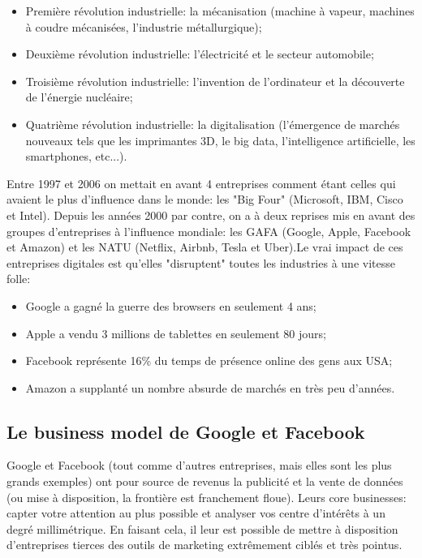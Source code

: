 \begin{itemize}
    \item Première révolution industrielle: la mécanisation (machine à vapeur, machines à coudre mécanisées, l'industrie métallurgique);
    \item Deuxième révolution industrielle: l'électricité et le secteur automobile;
    \item Troisième révolution industrielle: l'invention de l'ordinateur et la découverte de l'énergie nucléaire;
    \item Quatrième révolution industrielle: la digitalisation (l'émergence de marchés nouveaux tels que les imprimantes 3D, le big data, l'intelligence artificielle, les smartphones, etc...).\\
\end{itemize}

Entre 1997 et 2006 on mettait en avant 4 entreprises comment étant celles qui avaient le plus d'influence dans le monde: les "Big Four" (Microsoft, IBM, Cisco et Intel). Depuis les années 2000 par contre, on a à deux reprises mis en avant des groupes d'entreprises à l'influence mondiale: les GAFA (Google, Apple, Facebook et Amazon) et les NATU (Netflix, Airbnb, Tesla et Uber).Le vrai impact de ces entreprises digitales est qu'elles "disruptent" toutes les industries à une vitesse folle:

\begin{itemize}
    \item Google a gagné la guerre des browsers en seulement 4 ans;
    \item Apple a vendu 3 millions de tablettes en seulement 80 jours;
    \item Facebook représente 16\% du temps de présence online des gens aux USA;
    \item Amazon a supplanté un nombre absurde de marchés en très peu d'années.
\end{itemize}

\subsection{Le business model de Google et Facebook}

Google et Facebook (tout comme d'autres entreprises, mais elles sont les plus grands exemples) ont pour source de revenus la publicité et la vente de données (ou mise à disposition, la frontière est franchement floue). Leurs core businesses: capter votre attention au plus possible et analyser vos centre d'intérêts à un degré millimétrique. En faisant cela, il leur est possible de mettre à disposition d'entreprises tierces des outils de marketing extrêmement ciblés et très pointus. \\

